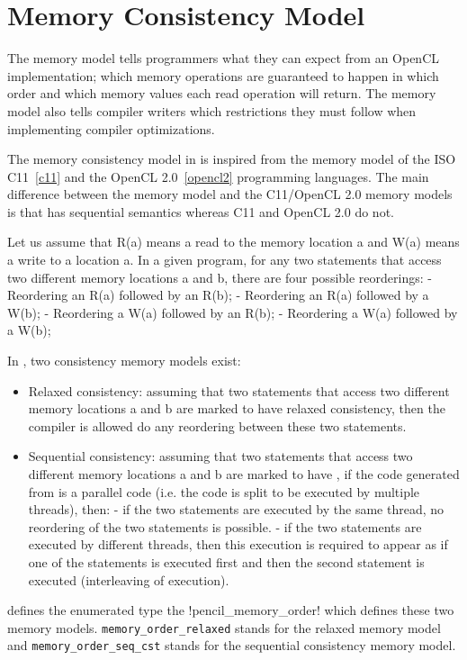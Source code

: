 \section{Memory Consistency Model}

The \pencil memory model tells programmers what they can expect from an OpenCL
implementation; which memory operations are guaranteed to happen in which order
and which memory values each read operation will return.
The memory model also tells compiler writers which restrictions they must follow
when implementing compiler optimizations.

The memory consistency model in \pencil is inspired from the memory model of
the ISO C11~\ref{c11} and the OpenCL 2.0~\ref{opencl2} programming languages.
The main difference between the \pencil memory model and the C11/OpenCL 2.0
memory models is that \pencil has sequential semantics whereas C11 and OpenCL
2.0 do not.

Let us assume that R(a) means a read to the memory location a and W(a) means
a write to a location a.
In a given program, for any two statements that access two different memory
locations a and b, there are four possible reorderings:
- Reordering an R(a) followed by an R(b);
- Reordering an R(a) followed by a  W(b);
- Reordering a  W(a) followed by an R(b);
- Reordering a  W(a) followed by a  W(b);

In \pencil, two consistency memory models exist:
\begin{itemize}
  \item Relaxed consistency: assuming that two statements that access two
  different memory locations a and b are marked to have relaxed consistency,
  then the compiler is allowed do any reordering between these
  two statements.
  \item Sequential consistency: assuming that two statements that access two
  different memory locations a and b are marked to have , if the code generated from \pencil is a parallel code
  (i.e. the code is split to be executed by multiple threads), then:
 	- if the two statements are executed by the same thread,
 	no reordering of the two statements is possible.
  	- if the two statements are executed by different threads, then this
  	execution is required to appear as if one of the statements is executed
  	first and then the second statement is executed (interleaving
  	of execution).
\end{itemize}

\pencil defines the enumerated type the \lstlisting!pencil_memory_order!
which defines these two memory models.
\lstinline!memory_order_relaxed! stands for the relaxed memory model and
\lstinline!memory_order_seq_cst! stands for the sequential consistency memory
model.

